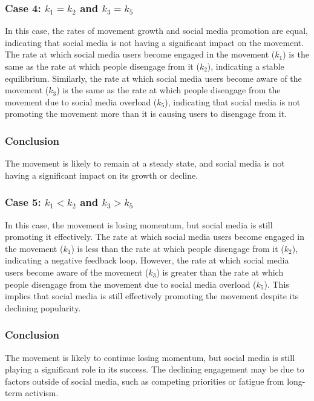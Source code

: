 \documentclass{article}
\begin{document}
    \subsubsection*{Case 4: $k_1 = k_2$ and $k_3 = k_5$}

    In this case, the rates of movement growth and social media promotion are equal, indicating that social media is not having a significant impact on the movement. The rate at which social media users become engaged in the movement ($k_1$) is the same as the rate at which people disengage from it ($k_2$), indicating a stable equilibrium. Similarly, the rate at which social media users become aware of the movement ($k_3$) is the same as the rate at which people disengage from the movement due to social media overload ($k_5$), indicating that social media is not promoting the movement more than it is causing users to disengage from it.

    \subsubsection*{Conclusion} The movement is likely to remain at a steady state, and social media is not having a significant impact on its growth or decline.

    \subsubsection*{Case 5: $k_1 < k_2$ and $k_3 > k_5$}

    In this case, the movement is losing momentum, but social media is still promoting it effectively. The rate at which social media users become engaged in the movement ($k_1$) is less than the rate at which people disengage from it ($k_2$), indicating a negative feedback loop. However, the rate at which social media users become aware of the movement ($k_3$) is greater than the rate at which people disengage from the movement due to social media overload ($k_5$). This implies that social media is still effectively promoting the movement despite its declining popularity.

    \subsubsection*{Conclusion}
    The movement is likely to continue losing momentum, but social media is still playing a significant role in its success. The declining engagement may be due to factors outside of social media, such as competing priorities or fatigue from long-term activism.
\end{document}
